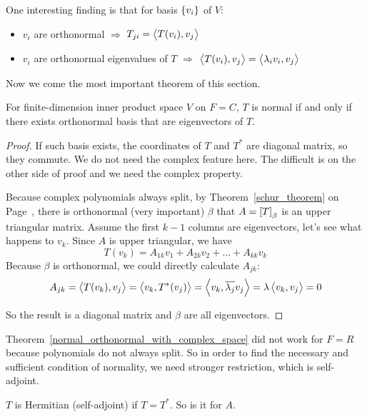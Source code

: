 One interesting finding is that for basis $\set{v_i}$ of $V$:
\begin{itemize}
    \item $v_i$ are orthonormal $\Rightarrow$ $T_{ji} = \left\langle \displaystyle T(v_i), v_j \right\rangle$
    \item $v_i$ are orthonormal eigenvalues of $T$ $\Rightarrow$ $\left\langle \displaystyle T(v_i), v_j \right\rangle = \left\langle \displaystyle \lambda_i v_i, v_j \right\rangle$
\end{itemize}


Now we come the most important theorem of this section.

\begin{theorem}\label{normal_orthonormal_with_complex_space}
    For finite-dimension inner product space $V$ on $F=C$, $T$ is normal if and only if there exists orthonormal basis that are eigenvectors of $T$.
\end{theorem}
\begin{proof}
    If such basis exists, the coordinates of $T$ and $T^*$ are diagonal matrix, so they commute. We do not need the complex feature here. The difficult is on the other side of proof and we need the complex property.
    
    Because complex polynomials always split, by Theorem~\ref{schur_theorem} on Page~\pageref{schur_theorem}, there is orthonormal (very important) $\beta$ that $A=\coordinate{T}_\beta$ is an upper triangular matrix. Assume the first $k-1$ columns are eigenvectors, let's see what happens to $v_{k}$. Since $A$ is upper triangular, we have
    \begin{equation*}
        T(v_k) = A_{1k} v_1 + A_{2k} v_2 + ... + A_{kk} v_k
    \end{equation*}
    Because $\beta$ is orthonormal, we could directly calculate $A_{jk}$:
    \begin{equation*}
        A_{jk} = \left\langle \displaystyle T(v_k), v_j \right\rangle = \left\langle \displaystyle v_k, T^*(v_j) \right\rangle = \left\langle \displaystyle v_k, \overline{\lambda_j} v_j \right\rangle = \lambda \left\langle \displaystyle v_k, v_j \right\rangle = 0
    \end{equation*}
    
    So the result is a diagonal matrix and $\beta$ are all eigenvectors.
\end{proof}

Theorem~\ref{normal_orthonormal_with_complex_space} did not work for $F=R$ because polynomials do not always split. So in order to find the necessary and sufficient condition of normality, we need stronger restriction, which is self-adjoint.

\begin{definition}
    $T$ is Hermitian (self-adjoint) if $T = T^*$. So is it for $A$.
\end{definition}

